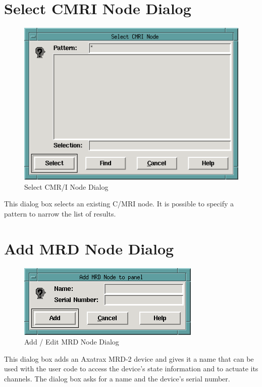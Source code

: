 \section{Select CMRI Node Dialog}

\begin{figure}[hbpt]
\begin{centering}
\includegraphics{DISPSelectCMRINodeDialog.png}
\caption{Select CMR/I Node Dialog}
\label{fig:dispatcher:selectcmrinodedialog}
\end{centering}
\end{figure}
%
This dialog box selects an existing C/MRI node. It is possible to
specify a pattern to narrow the list of results.

\section{Add MRD Node Dialog}

\begin{figure}[hbpt]
\begin{centering}
\includegraphics{DISPAddEditMRDNode.png}
\caption{Add / Edit MRD Node Dialog}
\label{fig:dispatcher:addeditmrdnodedialog}
\end{centering}
\end{figure}
%
This dialog box adds an Axatrax MRD-2 device and gives it a name that
can be used with the user code to access the device's state information
and to actuate its channels.  The dialog box asks for a name and the
device's serial number.

